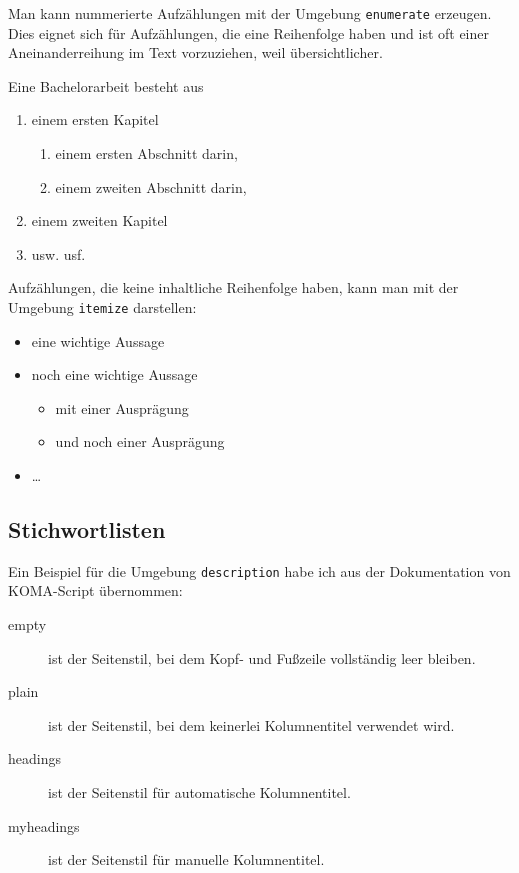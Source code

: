 Man kann nummerierte Aufzählungen mit der Umgebung \verb=enumerate=
erzeugen. Dies eignet sich für Aufzählungen, die eine Reihenfolge haben
und ist oft einer Aneinanderreihung im Text vorzuziehen, weil
übersichtlicher.

Eine Bachelorarbeit besteht aus

\begin{enumerate}
	\item einem ersten Kapitel
		\begin{enumerate}
			\item einem ersten Abschnitt darin,
			\item einem zweiten Abschnitt darin,
		\end{enumerate}
	\item einem zweiten Kapitel
	\item usw. usf.	
\end{enumerate}

Aufzählungen, die keine inhaltliche Reihenfolge haben, kann man mit der
Umgebung \verb=itemize= darstellen:

\begin{itemize}
	\item eine wichtige Aussage
	\item noch eine wichtige Aussage
		\begin{itemize}
			\item mit einer Ausprägung
			\item und noch einer Ausprägung	
		\end{itemize}
	\item \dots
\end{itemize}

\subsection{Stichwortlisten}
\label{sec:stichwortlisten}

Ein Beispiel für die Umgebung \verb=description= habe ich aus der
Dokumentation von \textsf{KOMA-Script} übernommen:

\begin{description}
	\item[empty] ist der Seitenstil, bei dem Kopf- und Fußzeile vollständig 
		leer bleiben. 
	\item[plain] ist der Seitenstil, bei dem keinerlei Kolumnentitel verwendet wird. 
	\item[headings] ist der Seitenstil für automatische Kolumnentitel. 
	\item[myheadings] ist der Seitenstil für manuelle Kolumnentitel. 
\end{description}

